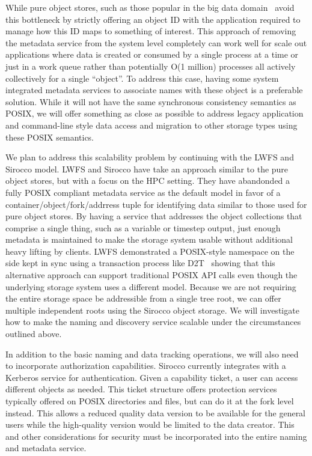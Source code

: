 While pure object stores, such as those popular in the big data
domain~\cite{memcached,others} avoid this bottleneck by strictly offering an
object ID with the application required to manage how this ID maps to something
of interest. This approach of removing the metadata service from the system
level completely can work well for scale out applications where data is created
or consumed by a single process at a time or just in a work queue rather than
potentially O(1 million) processes all actively collectively for a single
``object''. To address this case, having some system integrated metadata
services to associate names with these object is a preferable solution. While
it will not have the same synchronous consistency semantics as POSIX, we will
offer something as close as possible to address legacy application and
command-line style data access and migration to other storage types using these
POSIX semantics.

We plan to address this scalability problem by continuing with the LWFS and
Sirocco model. LWFS and Sirocco have take an approach similar to the pure
object stores, but with a focus on the HPC setting. They have abandonded a
fully POSIX compliant metadata service as the default model in favor of a
container/object/fork/addrress tuple for identifying data similar to those used
for pure object stores. By having a service that addresses the object
collections that comprise a single thing, such as a variable or timestep
output, just enough metadata is maintained to make the storage system usable
without additional heavy lifting by clients.  LWFS demonstrated a POSIX-style
namespace on the side kept in sync using a transaction process like
D2T~\cite{d2t} showing that this alternative approach can support traditional
POSIX API calls even though the underlying storage system uses a different
model. Because we are not requiring the entire storage space be addressible
from a single tree root, we can offer multiple independent roots using the
Sirocco object storage. We will investigate how to make the naming and
discovery service scalable under the circumstances outlined above.

In addition to the basic naming and data tracking operations, we will also need
to incorporate authorization capabilities. Sirocco currently integrates with a
Kerberos service for authentication. Given a capability ticket, a user can
access different objects as needed. This ticket structure offers protection
services typically offered on POSIX directories and files, but can do it at the
fork level instead. This allows a reduced quality data version to be available
for the general users while the high-quality version would be limited to the
data creator. This and other considerations for security must be incorporated
into the entire naming and metadata service.

